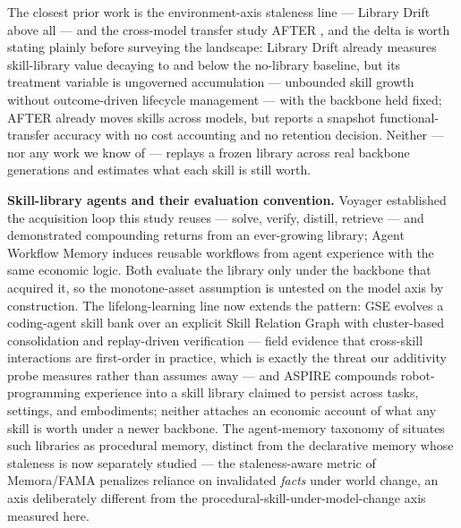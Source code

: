 \documentclass[11pt]{article}
\begin{document}
The closest prior work is the environment-axis staleness line --- Library Drift \citep{LibraryDrift2026} above all --- and the cross-model transfer study AFTER \citep{AFTER2026}, and the delta is worth stating plainly before surveying the landscape: Library Drift already measures skill-library value decaying to and below the no-library baseline, but its treatment variable is ungoverned accumulation --- unbounded skill growth without outcome-driven lifecycle management --- with the backbone held fixed; AFTER already moves skills across models, but reports a snapshot functional-transfer accuracy with no cost accounting and no retention decision. Neither --- nor any work we know of --- replays a frozen library across real backbone generations and estimates what each skill is still worth.

\textbf{Skill-library agents and their evaluation convention.} Voyager \citep{Voyager2023} established the acquisition loop this study reuses --- solve, verify, distill, retrieve --- and demonstrated compounding returns from an ever-growing library; Agent Workflow Memory \citep{AWM2024} induces reusable workflows from agent experience with the same economic logic. Both evaluate the library only under the backbone that acquired it, so the monotone-asset assumption is untested on the model axis by construction. The lifelong-learning line now extends the pattern: GSE \citep{GSE2026} evolves a coding-agent skill bank over an explicit Skill Relation Graph with cluster-based consolidation and replay-driven verification --- field evidence that cross-skill interactions are first-order in practice, which is exactly the threat our additivity probe measures rather than assumes away --- and ASPIRE \citep{ASPIRE2026} compounds robot-programming experience into a skill library claimed to persist across tasks, settings, and embodiments; neither attaches an economic account of what any skill is worth under a newer backbone. The agent-memory taxonomy of \citet{CoALA2024} situates such libraries as procedural memory, distinct from the declarative memory whose staleness is now separately studied --- the staleness-aware metric of Memora/FAMA \citep{Memora2026} penalizes reliance on invalidated \emph{facts} under world change, an axis deliberately different from the procedural-skill-under-model-change axis measured here.
\end{document}
